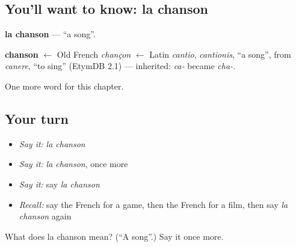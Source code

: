 \subsection*{You'll want to know: la chanson}
\textbf{la chanson} — \textquotedblleft{}a song\textquotedblright{}.

\begin{cousinweb}
\textbf{chanson} $\leftarrow$ Old French \emph{chançon} $\leftarrow$ Latin \emph{cantio}, \emph{cantionis}, \textquotedblleft{}a song\textquotedblright{}, from \emph{canere}, \textquotedblleft{}to sing\textquotedblright{} (EtymDB 2.1) — inherited: \emph{ca-} became \emph{cha-}.
\end{cousinweb}

\begin{grammarlens}[title={What you've built}]
One more word for this chapter.
\end{grammarlens}

\subsection*{Your turn}
\begin{itemize}
\raggedright
  \item \emph{Say it:} \emph{la chanson}
  \item \emph{Say it:} \emph{la chanson}, once more
  \item \emph{Say it:} say \emph{la chanson}
  \item \emph{Recall:} say the French for a game, then the French for a film, then say \emph{la chanson} again
\end{itemize}

\begin{tcolorbox}[breakable,colback=teal!4,colframe=teal!35!black,title={Before you move on}]
What does la chanson mean? (\textquotedblleft{}A song\textquotedblright{}.) Say it once more.
\end{tcolorbox}
